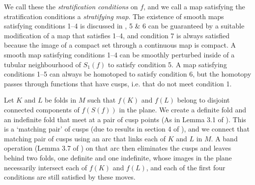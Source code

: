 We call these the \emph{stratification conditions} on $f$, and we call a map satisfying the stratification conditions a \emph{stratifying map}.
The existence of smooth maps satisfying conditions 1--4 is discussed in \cite{Levine65}, 5 \& 6 can be guaranteed by a suitable modification of a map that satisfies 1--4, and condition 7 is always satisfied because the image of a compact set through a continuous map is compact.
A smooth map satisfying conditions 1--4 can be smoothly perturbed inside of a tubular neighbourhood of $S_1(f)$ to satisfy condition 5.
A map satisfying conditions 1--5 can always be homotoped to satisfy condition 6, but the homotopy passes through functions that have cusps, i.e. that do not meet condition 1.

Let $K$ and $L$ be folds in $M$ such that $f(K)$ and $f(L)$ belong to disjoint connected components of $f(S(f))$ in the plane.
We create a definite fold and an indefinite fold that meet at a pair of cusp points (As in Lemma 3.1 of \cite{saeki1995constructing}).
This is a `matching pair' of cusps (due to results in section 4 of \cite{Levine65}), and we connect that matching pair of cusps using an arc that links each of $K$ and $L$ in $M$.
A band operation (Lemma 3.7 of \cite{saeki1995constructing}) on that arc then eliminates the cusps and leaves behind two folds, one definite and one indefinite, whose images in the plane necessarily intersect each of $f(K)$ and $f(L)$, and each of the first four conditions are still satisfied by these moves.

